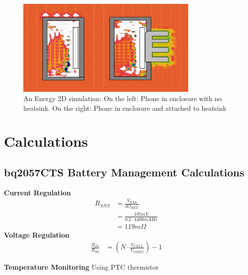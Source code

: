 \documentclass{article}
\numberwithin{figure}{section}
\numberwithin{equation}{section}
\begin{document}
{\begin{figure}[H]
	\centering
	\includegraphics[width=0.8\textwidth]{thermal4}
	\caption{An Energy 2D simulation: On the left: Phone in enclosure with no heatsink. On the right: Phone in enclosure and attached to heatsink}
	\label{fig:append_thermal}
\end{figure}

\newpage
\section{Calculations} \label{sect:appendixD}
\subsection{bq2057CTS Battery Management Calculations} \label{sect:bqcalcs}
\textbf{Current Regulation}
\begin{align}
  \label{eq:currentreg}
  R_{SNS} &= \frac{V_{SNS}}{IO_{REG}} \\
  &= \frac{105mV}{0.2 \cdot 4400mAHr} \\
  &= 119m\Omega
\end{align}
\textbf{Voltage Regulation}
\begin{align}
  \label{eq:voltreg}
  \frac{R_{B1}}{R_{B2}} &= \left(N \cdot \frac{V_{CELL}}{V_{OREG}}\right) - 1
\end{align}

\textbf{Temperature Monitoring} \newline
Using PTC thermistor

}
\end{document}
